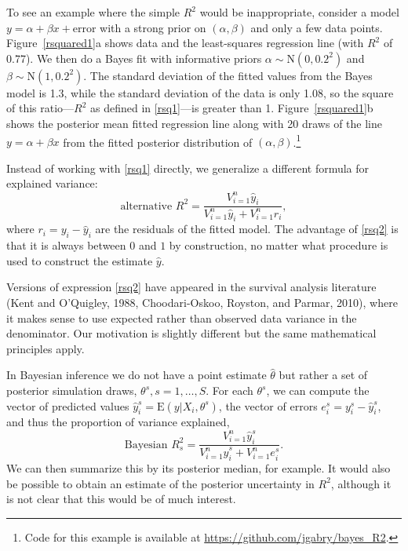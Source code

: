 \documentclass[11pt]{article}
\begin{document}
To see an example where the simple $R^2$ would be inappropriate, consider a model
$y = \alpha + \beta x+\mbox{error}$
with a strong prior on $(\alpha,\beta)$ and only a few data points.
Figure~\ref{rsquared1}a shows data and the least-squares regression line (with
$R^2$ of 0.77).  We then do a Bayes fit with informative priors
$\alpha \sim \mbox{N}(0,0.2^2)$ and $\beta \sim \mbox{N}(1,0.2^2)$.  The
standard deviation of the fitted values from the Bayes model is 1.3, while the
standard deviation of the data is only 1.08, so the square of this
ratio---$R^2$ as defined in \eqref{rsq1}---is greater than 1.
Figure~\ref{rsquared1}b shows the posterior mean fitted regression line along
with 20 draws of the line $y = \alpha + \beta x$ from the fitted posterior
distribution of $(\alpha,\beta)$.\footnote{Code for this example is available at \url{https://github.com/jgabry/bayes_R2}.}

Instead of working with \eqref{rsq1} directly, we generalize a different formula
for explained variance:
%
\begin{equation}\label{rsq2}
\mbox{alternative } R^2 = \frac{V_{i=1}^n\hat{y}_i}{V_{i=1}^n \hat{y}_i  + V_{i=1}^n r_i},
\end{equation}
%
where $r_i = y_i -\hat{y}_i$ are the residuals of the fitted model.
The advantage of \eqref{rsq2} is that it is always between $0$ and $1$ by
construction, no matter what procedure is used to construct the estimate
$\hat{y}$.

Versions of expression \eqref{rsq2} have appeared in the survival analysis
literature (Kent and O'Quigley, 1988, Choodari-Oskoo, Royston, and Parmar,
2010), where it makes sense to use expected rather than observed data variance
in the denominator.  Our motivation is slightly different but the same
mathematical principles apply.

In Bayesian inference we do not have a point estimate $\hat{\theta}$ but rather
a set of posterior simulation draws, $\theta^s, s=1,\ldots,S$.
For each $\theta^s$, we can compute the vector of predicted values
$\hat{y}_i^s = \mbox{E}(y | X_i,\theta^s)$, the vector of errors
$e_i^s = y_i^s - \hat{y}_i^s$, and thus the proportion of variance explained,
%
\begin{equation}\label{rsq3}
\mbox{Bayesian } R^2_s=\frac{V_{i=1}^n\hat{y}_i^s}{V_{i=1}^n \hat{y}_i^s  + V_{i=1}^n e_i^s}.
\end{equation}
%
We can then summarize this by its posterior median, for example. It would also
be possible to obtain an estimate of the posterior uncertainty in $R^2$,
although it is not clear that this would be of much interest.
\end{document}
